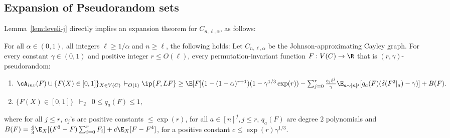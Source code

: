 \subsection{Expansion of Pseudorandom sets}
Lemma~\ref{lem:leveli-j} directly implies an expansion theorem for $C_{n,\ell,\alpha}$, as follows:
\begin{theorem}\label{thm:structure-johnson-cayley}
For all $\alpha \in (0,1)$, all integers $\ell \geq 1/\alpha$ and $n \geq \ell$, the following holds: Let $C_{n,\ell,\alpha}$ be the Johnson-approximating Cayley graph. For every constant $\gamma \in (0,1)$ and positive integer $r \leq O(\ell)$, every permutation-invariant function $F: V(C) \rightarrow \R$ that is $(r,\gamma)$-pseudorandom:
\begin{enumerate}
\item $\cA_{inv}(F) \cup \{F(X) \in [0,1]\}_{X \in V(C)} \, \vdash_{O(1)}\, \\
\ip{F, LF} \geq \E[F](1 - (1-\alpha)^{r+1})(1- \gamma^{1/3}\exp(r)) - \sum_{j = 0}^r \frac{ c_j\ell^{j}}{\gamma}\E_{a \sim [n]^{j}}[q_a(F)({\delta(F^{ 2}|_a) - \gamma)}] + B(F).$
\item $\{F(X) \in [0,1]\} \,\,\, \vdash_{2} \,\,\, 0 \leq q_a(F) \leq 1,$
\end{enumerate}
where for all $j \leq r$, $c_j$'s are positive constants $\leq \exp(r)$, for all $a \in [n]^j, j \leq r$, $q_a(F)$ are degree $2$  polynomials and $B(F) = \frac{4}{3}\E_X[(F^{ 3} - F)\sum_{i = 0}^r F_i] + c\E_X[F - F^{ 4}]$, for a positive constant $c \leq \exp(r)\gamma^{1/3}$.
\end{theorem}


